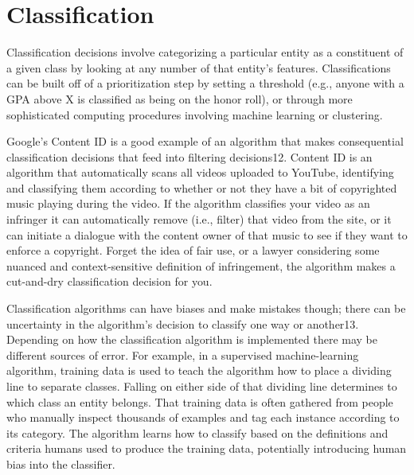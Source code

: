 \section{Classification }
Classification decisions involve categorizing a particular entity as a constituent of a given class by looking at any number of that entity's features. Classifications can be built off of a prioritization step by setting a threshold (e.g., anyone with a GPA above X is classified as being on the honor roll), or through more sophisticated computing procedures involving machine learning or clustering. 

Google's Content ID is a good example of an algorithm that makes consequential classification decisions that feed into filtering decisions12. Content ID is an algorithm that automatically scans all videos uploaded to YouTube, identifying and classifying them according to whether or not they have a bit of copyrighted music playing during the video. If the algorithm classifies your video as an infringer it can automatically remove (i.e., filter) that video from the site, or it can initiate a dialogue with the content owner of that music to see if they want to enforce a copyright. Forget the idea of fair use, or a lawyer considering some nuanced and context-sensitive definition of infringement, the algorithm makes a cut-and-dry classification decision for you. 

Classification algorithms can have biases and make mistakes though; there can be uncertainty in the algorithm's decision to classify one way or another13. Depending on how the classification algorithm is implemented there may be different sources of error. For example, in a supervised machine-learning algorithm, training data is used to teach the algorithm how to place a dividing line to separate classes. Falling on either side of that dividing line determines to which class an entity belongs. That training data is often gathered from people who manually inspect thousands of examples and tag each instance according to its category. The algorithm learns how to classify based on the definitions and criteria humans used to produce the training data, potentially introducing human bias into the classifier. 

